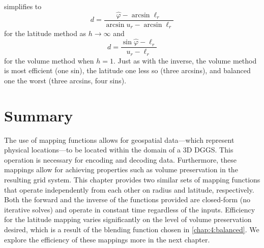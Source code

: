  simplifies to
%
\begin{equation*}
d = \frac{ \hat{\varphi} - \arcsin \ell_r }{ \arcsin u_r - \arcsin \ell_r}
\end{equation*}
%
for the latitude method as $h \rightarrow \infty$ and
%
\begin{equation*}
d = \frac{ \sin \hat{\varphi} - \ell_r }{ u_r - \ell_r }
\end{equation*}
%
for the volume method when $h = 1$.
Just as with the inverse, the volume method is most efficient (one sin), the latitude one less so (three arcsins), and balanced one the worst (three arcsins, four sins).


\section{Summary}
The use of mapping functions allows for geospatial data---which represent physical locations---to be located within the domain of a 3D DGGS.
This operation is necessary for encoding and decoding data.
Furthermore, these mappings allow for achieving properties such as volume preservation in the resulting grid system.
This chapter provides two similar sets of mapping functions that operate independently from each other on radius and latitude, respectively.
Both the forward and the inverse of the functions provided are closed-form (no iterative solves) and operate in constant time regardless of the inputs.
Efficiency for the latitude mapping varies significantly on the level of volume preservation desired, which is a result of the blending function chosen in \cref{chap:4:balanced}.
We explore the efficiency of these mappings more in the next chapter.
